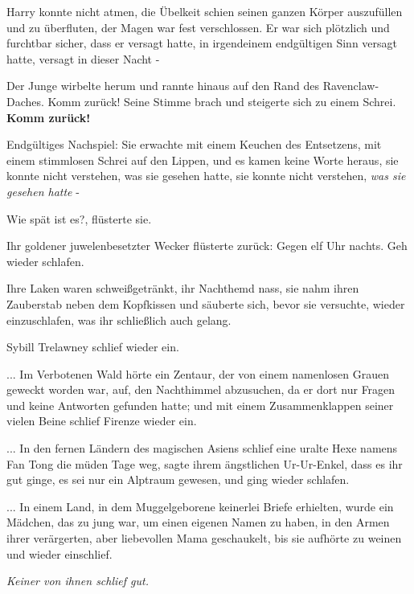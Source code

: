 Harry konnte nicht atmen, die Übelkeit schien seinen ganzen Körper auszufüllen
und zu überfluten, der Magen war fest verschlossen. Er war sich plötzlich und
furchtbar sicher, dass er versagt hatte, in irgendeinem endgültigen Sinn versagt
hatte, versagt in dieser Nacht -

Der Junge wirbelte herum und rannte hinaus auf den Rand des Ravenclaw-Daches.
\glqq{}Komm zurück!\grqq{} Seine Stimme brach und steigerte sich zu einem Schrei.
\glqq{}\textbf{Komm zurück!}\grqq{}

Endgültiges Nachspiel: Sie erwachte mit einem Keuchen des Entsetzens, mit einem
stimmlosen Schrei auf den Lippen, und es kamen keine Worte heraus, sie konnte
nicht verstehen, was sie gesehen hatte, sie konnte nicht verstehen, \emph{was
sie gesehen hatte} -

\glqq{}Wie spät ist es?\grqq{}, flüsterte sie.

Ihr goldener juwelenbesetzter Wecker flüsterte zurück: \glqq{}Gegen elf Uhr
nachts. Geh wieder schlafen.\grqq{}

Ihre Laken waren schweißgetränkt, ihr Nachthemd nass, sie nahm ihren Zauberstab
neben dem Kopfkissen und säuberte sich, bevor sie versuchte, wieder
einzuschlafen, was ihr schließlich auch gelang.

Sybill Trelawney schlief wieder ein.

... Im Verbotenen Wald hörte ein Zentaur, der von einem namenlosen Grauen
geweckt worden war, auf, den Nachthimmel abzusuchen, da er dort nur Fragen und
keine Antworten gefunden hatte; und mit einem Zusammenklappen seiner vielen
Beine schlief Firenze wieder ein.

... In den fernen Ländern des magischen Asiens schlief eine uralte Hexe namens
Fan Tong die müden Tage weg, sagte ihrem ängstlichen Ur-Ur-Enkel, dass es ihr
gut ginge, es sei nur ein Alptraum gewesen, und ging wieder schlafen.

... In einem Land, in dem Muggelgeborene keinerlei Briefe erhielten, wurde ein
Mädchen, das zu jung war, um einen eigenen Namen zu haben, in den Armen ihrer
verärgerten, aber liebevollen Mama geschaukelt, bis sie aufhörte zu weinen und
wieder einschlief.

\emph{Keiner von ihnen schlief gut.
}


